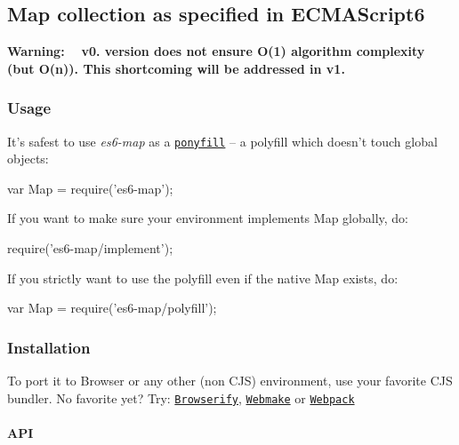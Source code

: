 \subsection*{Map collection as specified in E\+C\+M\+A\+Script6}

{\bfseries Warning\+: ~\newline
v0. version does not ensure O(1) algorithm complexity (but O(n)). This shortcoming will be addressed in v1.}

\subsubsection*{Usage}

It’s safest to use {\itshape es6-\/map} as a \href{https://ponyfill.com}{\tt ponyfill} – a polyfill which doesn’t touch global objects\+:


\begin{DoxyCode}
var Map = require('es6-map');
\end{DoxyCode}


If you want to make sure your environment implements {\ttfamily Map} globally, do\+:


\begin{DoxyCode}
require('es6-map/implement');
\end{DoxyCode}


If you strictly want to use the polyfill even if the native {\ttfamily Map} exists, do\+:


\begin{DoxyCode}
var Map = require('es6-map/polyfill');
\end{DoxyCode}


\subsubsection*{Installation}



To port it to Browser or any other (non C\+JS) environment, use your favorite C\+JS bundler. No favorite yet? Try\+: \href{http://browserify.org/}{\tt Browserify}, \href{https://github.com/medikoo/modules-webmake}{\tt Webmake} or \href{http://webpack.github.io/}{\tt Webpack}

\paragraph*{A\+PI}

